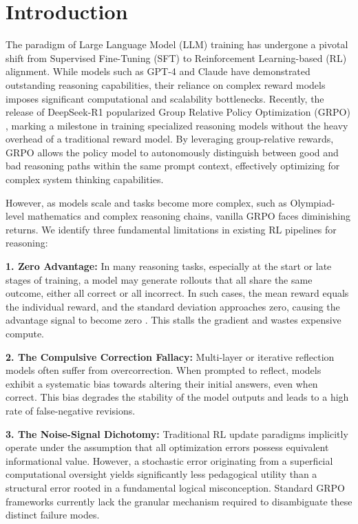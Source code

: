 \section{Introduction}

The paradigm of Large Language Model (LLM) training has undergone a pivotal shift from Supervised Fine-Tuning (SFT) to Reinforcement Learning-based (RL) alignment. While models such as GPT-4 \cite{Achiam2023GPT4TR} and Claude \cite{TheC3} have demonstrated outstanding reasoning capabilities, their reliance on complex reward models imposes significant computational and scalability bottlenecks. Recently, the release of DeepSeek-R1 popularized Group Relative Policy Optimization (GRPO) \cite{shao2024deepseekmathpushinglimitsmathematical}, marking a milestone in training specialized reasoning models without the heavy overhead of a traditional reward model. By leveraging group-relative rewards, GRPO allows the policy model to autonomously distinguish between good and bad reasoning paths within the same prompt context, effectively optimizing for complex system thinking capabilities.

However, as models scale and tasks become more complex, such as Olympiad-level mathematics and complex reasoning chains, vanilla GRPO faces diminishing returns. We identify three fundamental limitations in existing RL pipelines for reasoning:

\textbf{1. Zero Advantage:} In many reasoning tasks, especially at the start or late stages of training, a model may generate rollouts that all share the same outcome, either all correct or all incorrect. In such cases, the mean reward equals the individual reward, and the standard deviation approaches zero, causing the advantage signal to become zero \cite{zhang2026trainlesslearnmore}. This stalls the gradient and wastes expensive compute.

\textbf{2. The Compulsive Correction Fallacy:} Multi-layer \cite{ding2025multilayergrpoenhancingreasoning} or iterative reflection models \cite{madaan2023selfrefineiterativerefinementselffeedback} often suffer from overcorrection. When prompted to reflect, models exhibit a systematic bias towards altering their initial answers, even when correct. This bias degrades the stability of the model outputs and leads to a high rate of false-negative revisions.

\textbf{3. The Noise-Signal Dichotomy:} Traditional RL update paradigms implicitly operate under the assumption that all optimization errors possess equivalent informational value. However, a stochastic error originating from a superficial computational oversight yields significantly less pedagogical utility than a structural error rooted in a fundamental logical misconception. Standard GRPO frameworks currently lack the granular mechanism required to disambiguate these distinct failure modes.

